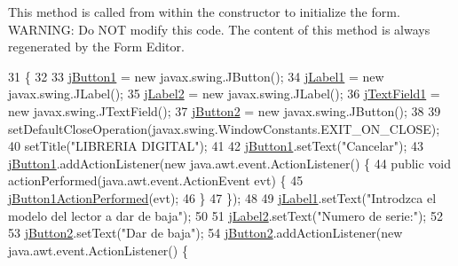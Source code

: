 This method is called from within the constructor to initialize the form. W\+A\+R\+N\+I\+NG\+: Do N\+OT modify this code. The content of this method is always regenerated by the Form Editor. 
\begin{DoxyCode}
31                                   \{
32 
33         \mbox{\hyperlink{class_interfaz_package_1_1_baja_lector_ac8cdd8217744e010d4f23c911fafda3e}{jButton1}} = \textcolor{keyword}{new} javax.swing.JButton();
34         \mbox{\hyperlink{class_interfaz_package_1_1_baja_lector_aa981bd8695b99b2bfaf0d7af80e1475b}{jLabel1}} = \textcolor{keyword}{new} javax.swing.JLabel();
35         \mbox{\hyperlink{class_interfaz_package_1_1_baja_lector_a9b41f7f44ecf39652a7f7938173d29c5}{jLabel2}} = \textcolor{keyword}{new} javax.swing.JLabel();
36         \mbox{\hyperlink{class_interfaz_package_1_1_baja_lector_a7a476ef16a2314a268fb7e53e32cdd31}{jTextField1}} = \textcolor{keyword}{new} javax.swing.JTextField();
37         \mbox{\hyperlink{class_interfaz_package_1_1_baja_lector_aea778ac52e2bd99213ebd7e1c1d23e09}{jButton2}} = \textcolor{keyword}{new} javax.swing.JButton();
38 
39         setDefaultCloseOperation(javax.swing.WindowConstants.EXIT\_ON\_CLOSE);
40         setTitle(\textcolor{stringliteral}{"LIBRERIA DIGITAL"});
41 
42         \mbox{\hyperlink{class_interfaz_package_1_1_baja_lector_ac8cdd8217744e010d4f23c911fafda3e}{jButton1}}.setText(\textcolor{stringliteral}{"Cancelar"});
43         \mbox{\hyperlink{class_interfaz_package_1_1_baja_lector_ac8cdd8217744e010d4f23c911fafda3e}{jButton1}}.addActionListener(\textcolor{keyword}{new} java.awt.event.ActionListener() \{
44             \textcolor{keyword}{public} \textcolor{keywordtype}{void} actionPerformed(java.awt.event.ActionEvent evt) \{
45                 \mbox{\hyperlink{class_interfaz_package_1_1_baja_lector_a7ebc81bebee5f75046ff282093b4fb16}{jButton1ActionPerformed}}(evt);
46             \}
47         \});
48 
49         \mbox{\hyperlink{class_interfaz_package_1_1_baja_lector_aa981bd8695b99b2bfaf0d7af80e1475b}{jLabel1}}.setText(\textcolor{stringliteral}{"Introdzca el modelo del lector a dar de baja"});
50 
51         \mbox{\hyperlink{class_interfaz_package_1_1_baja_lector_a9b41f7f44ecf39652a7f7938173d29c5}{jLabel2}}.setText(\textcolor{stringliteral}{"Numero de serie:"});
52 
53         \mbox{\hyperlink{class_interfaz_package_1_1_baja_lector_aea778ac52e2bd99213ebd7e1c1d23e09}{jButton2}}.setText(\textcolor{stringliteral}{"Dar de baja"});
54         \mbox{\hyperlink{class_interfaz_package_1_1_baja_lector_aea778ac52e2bd99213ebd7e1c1d23e09}{jButton2}}.addActionListener(\textcolor{keyword}{new} java.awt.event.ActionListener() \{

\end{DoxyCode}
